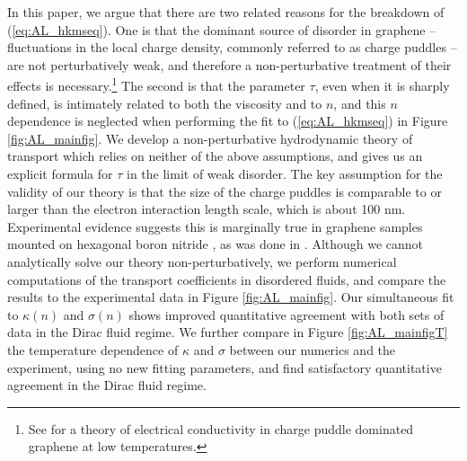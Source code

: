 In this paper, we argue that there are two related reasons for the breakdown of (\ref{eq:AL_hkmseq}).  One is that the dominant source of disorder in graphene -- fluctuations in the local charge density, commonly referred to as charge puddles \cite{martin_observation_2008, rossi_ground_2008, zhang_origin_2009, xue_scanning_2011} --  are not perturbatively weak, and therefore a non-perturbative treatment of their effects is necessary.\footnote{See \cite{adam_self-consistent_2007, rossi_effective_2009} for a theory of electrical conductivity in charge puddle dominated graphene at low temperatures.}   The second is that the parameter $\tau$, even when it is sharply defined, is intimately related to both the viscosity and to $n$, and this $n$ dependence is neglected when performing the  fit to (\ref{eq:AL_hkmseq}) in Figure \ref{fig:AL_mainfig}.    We develop a non-perturbative hydrodynamic theory of transport which relies on neither of the above assumptions, and gives us an explicit formula for $\tau$ in the limit of weak disorder.   The key assumption for the validity of our theory is that the size of the charge puddles is comparable to or larger than the electron interaction length scale, which is about 100 nm.   Experimental evidence suggests this is  marginally true in graphene samples mounted on hexagonal boron nitride \cite{xue_scanning_2011}, as was done in \cite{crossno_observation_2016}.   Although we cannot analytically solve our theory non-perturbatively, we perform numerical computations of the transport coefficients in disordered fluids, and compare the results to the experimental data in Figure \ref{fig:AL_mainfig}.  Our simultaneous fit to $\kappa(n)$ and $\sigma(n)$ shows improved quantitative agreement with both sets of data in the Dirac fluid regime.    We further compare in Figure \ref{fig:AL_mainfigT} the temperature dependence of $\kappa$ and $\sigma$ between our numerics and the experiment, using no new fitting parameters, and find satisfactory quantitative agreement in the Dirac fluid regime.  

